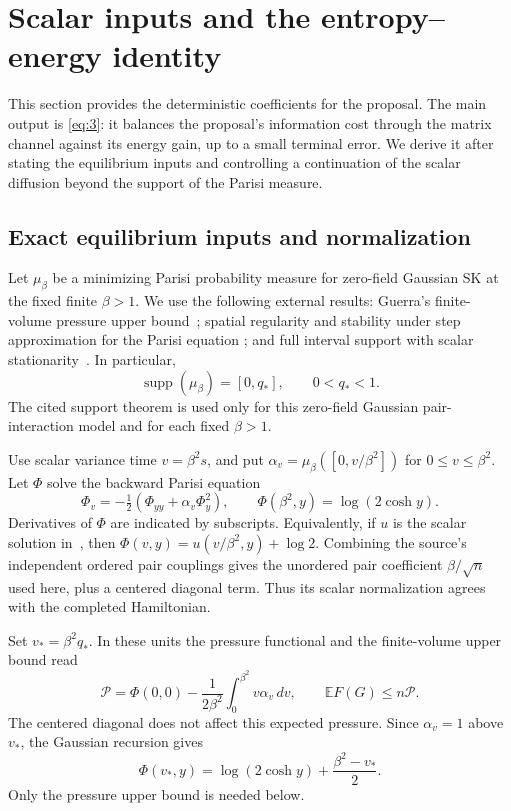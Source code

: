 \section{Scalar inputs and the entropy--energy identity}\label{sec:scalar}

This section provides the deterministic coefficients for the proposal.
The main output is \eqref{eq:3}: it balances the proposal's information
cost through the matrix channel against its energy gain, up to a small
terminal error.
We derive it after stating the equilibrium inputs and controlling a
continuation of the scalar diffusion beyond the support of the Parisi
measure.

\subsection{Exact equilibrium inputs and normalization}

Let $\mu_\beta$ be a minimizing Parisi probability measure for
zero-field Gaussian SK at the fixed finite $\beta>1$. We use the
following external results: Guerra's finite-volume pressure upper
bound~\cite[Theorem~3]{Guerra2003}; spatial regularity and stability
under step approximation for the Parisi equation
\cite[Propositions~1--2]{AC2015}; and full interval support with scalar
stationarity~\cite[Theorem~1.1, Lemma~2.2, Proposition~2.4, and
Lemma~2.5]{Lopatto2026}. In particular,
\[
 \operatorname{supp}(\mu_\beta)=[0,q_*],\qquad 0<q_*<1.
\]
The cited support theorem is used only for this zero-field Gaussian
pair-interaction model and for each fixed $\beta>1$.

Use scalar variance time $v=\beta^2s$, and put
$\alpha_v=\mu_\beta([0,v/\beta^2])$ for $0\le v\le\beta^2$.
Let $\Phi$ solve the backward Parisi equation
\[
 \Phi_v=-\tfrac12(\Phi_{yy}+\alpha_v\Phi_y^2),
 \qquad \Phi(\beta^2,y)=\log(2\cosh y).
\]
Derivatives of $\Phi$ are indicated by subscripts. Equivalently, if
$u$ is the scalar solution in~\cite{Lopatto2026}, then
$\Phi(v,y)=u(v/\beta^2,y)+\log2$. Combining the source's independent
ordered pair couplings gives the unordered pair coefficient
$\beta/\sqrt n$ used here, plus a centered diagonal term. Thus its
scalar normalization agrees with the completed Hamiltonian.

Set $v_*=\beta^2q_*$. In these units the pressure functional and the
finite-volume upper bound read
\[
 \mathcal P=\Phi(0,0)-\frac1{2\beta^2}
                 \int_0^{\beta^2}v\alpha_v\,dv,
 \qquad \mathbb E F(G)\le n\mathcal P.
\]
The centered diagonal does not affect this expected pressure. Since
$\alpha_v=1$ above $v_*$, the Gaussian recursion gives
\[
 \Phi(v_*,y)=\log(2\cosh y)+\frac{\beta^2-v_*}{2}.
\]
Only the pressure upper bound is needed below.

